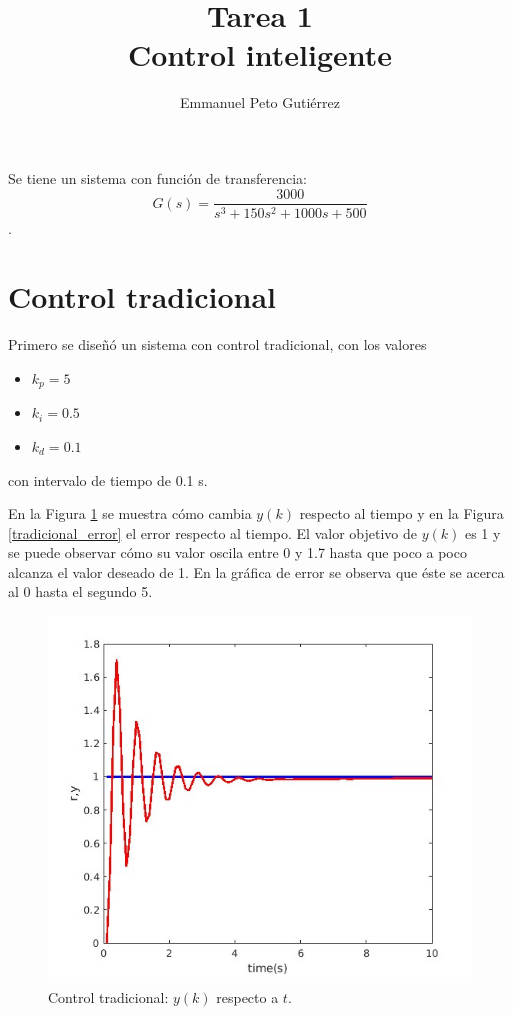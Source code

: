 \documentclass{article}
\title{Tarea 1\\Control inteligente}
\author{Emmanuel Peto Gutiérrez}
\begin{document}
\maketitle

Se tiene un sistema con función de transferencia: $$G(s) = \frac{3000}{s^3 + 150s^2 + 1000s + 500}$$.

\section{Control tradicional}

Primero se diseñó un sistema con control tradicional, con los valores
\begin{itemize}
\item $k_p = 5$
\item $k_i = 0.5$
\item $k_d = 0.1$
\end{itemize}

con intervalo de tiempo de 0.1 s.

En la Figura \ref{tradicional_y} se muestra cómo cambia $y(k)$ respecto al tiempo y en la Figura \ref{tradicional_error} el error respecto al tiempo. El valor objetivo de $y(k)$ es 1 y se puede observar cómo su valor oscila entre 0 y 1.7 hasta que poco a poco alcanza el valor deseado de 1. En la gráfica de error se observa que éste se acerca al 0 hasta el segundo 5.

\begin{figure}
\center
\includegraphics[scale=0.5]{trady.jpg}
\caption{Control tradicional: $y(k)$ respecto a $t$.}
\label{tradicional_y}
\end{figure}
\end{document}
